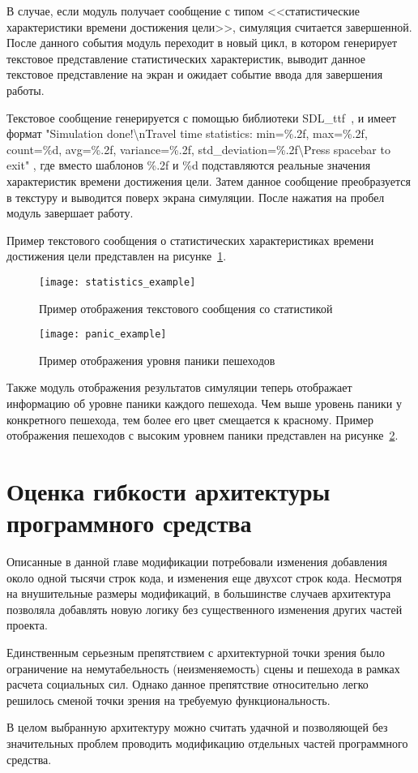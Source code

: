 В случае, если модуль получает сообщение с типом <<статистические характеристики времени достижения цели>>, симуляция считается завершенной.
После данного события модуль переходит в новый цикл, в котором генерирует текстовое представление статистических характеристик,
выводит данное текстовое представление на экран и ожидает событие ввода для завершения работы.

Текстовое сообщение генерируется с помощью библиотеки SDL\_ttf~\cite{libsdl_ttf_home}, и имеет формат
"Simulation done!\textbackslash{}nTravel time statistics: min=\%.2f, max=\%.2f, count=\%d, avg=\%.2f, variance=\%.2f, std\_deviation=\%.2f\textbackslash{}Press spacebar to exit" ,
где вместо шаблонов \%.2f и \%d подставляются реальные значения характеристик времени достижения цели.
Затем данное сообщение преобразуется в текстуру и выводится поверх экрана симуляции.  После нажатия на пробел модуль завершает работу.

Пример текстового сообщения о статистических характеристиках времени достижения цели представлен на рисунке~\ref{sec:development:animator:statistics_example}.

\begin{figure}[!ht]
  \centering
  \texttt{[image: statistics\_example]}
  \caption{Пример отображения текстового сообщения со статистикой}
  \label{sec:development:animator:statistics_example}
\end{figure}

\begin{figure}[!ht]
  \centering
  \texttt{[image: panic\_example]}
  \caption{Пример отображения уровня паники пешеходов}
  \label{sec:development:animator:panic_example}
\end{figure}

Также модуль отображения результатов симуляции теперь отображает информацию об уровне паники каждого пешехода.
Чем выше уровень паники у конкретного пешехода, тем более его цвет смещается к красному.
Пример отображения пешеходов с высоким уровнем паники представлен на рисунке~\ref{sec:development:animator:panic_example}.

\section{Оценка гибкости архитектуры программного средства}
\label{sec:development:arch}

Описанные в данной главе модификации потребовали изменения добавления около одной тысячи строк кода, и изменения еще двухсот строк кода.
Несмотря на внушительные размеры модификаций, в большинстве случаев архитектура позволяла добавлять новую логику без существенного изменения
других частей проекта.

Единственным серьезным препятствием с архитектурной точки зрения было ограничение на немутабельность (неизменяемость) сцены и пешехода в рамках расчета
социальных сил. Однако данное препятствие относительно легко решилось сменой точки зрения на требуемую функциональность.

В целом выбранную архитектуру можно считать удачной и
позволяющей без значительных проблем проводить модификацию отдельных частей программного средства.

